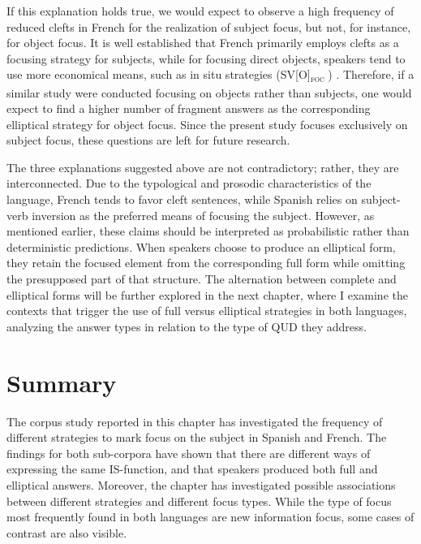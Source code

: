 {If this explanation holds true, we would expect to observe a high frequency of reduced clefts in French for the realization of subject focus, but not, for instance, for object focus. It is well established that French primarily employs clefts as a focusing strategy for subjects, while for focusing direct objects, speakers tend to use more economical means, such as in situ strategies (SV[O]\textsubscript{\textsc{foc}} \normalsize) \parencite{skopeteas2010focus, SkopeteasFanselow2011, destruel2016focus}. Therefore, if a similar study were conducted focusing on objects rather than subjects, one would expect to find a higher number of fragment answers as the corresponding elliptical strategy for object focus. Since the present study focuses exclusively on subject focus, these questions are left for future research.

The three explanations suggested above are not contradictory; rather, they are interconnected. Due to the typological and prosodic characteristics of the language, French tends to favor cleft sentences, while Spanish relies on subject-verb inversion as the preferred means of focusing the subject. However, as mentioned earlier, these claims should be interpreted as probabilistic rather than deterministic predictions. When speakers choose to produce an elliptical form, they retain the focused element from the corresponding full form while omitting the presupposed part of that structure.
The alternation between complete and elliptical forms will be further explored in the next chapter, where I examine the contexts that trigger the use of full versus elliptical strategies in both languages, analyzing the answer types in relation to the type of QUD they address.
 

\section{Summary} \label{sub:4.8}
The corpus study reported in this chapter has investigated the frequency of different strategies to mark focus on the subject in Spanish and French. The findings for both sub-corpora have shown that there are different ways of expressing the same IS-function, and that speakers produced both full and elliptical answers.
Moreover, the chapter has investigated possible associations between different strategies and different focus types. While the type of focus most frequently found in both languages are new information focus, some cases of contrast are also visible.

}
